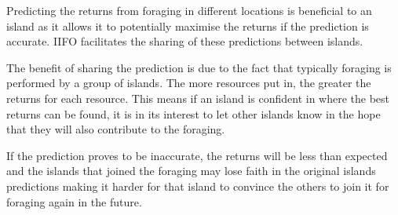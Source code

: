 Predicting the returns from foraging in different locations is beneficial to an island as it allows it to potentially maximise the returns if the prediction is accurate. IIFO facilitates the sharing of these predictions between islands.

The benefit of sharing the prediction is due to the fact that typically foraging is performed by a group of islands. The more resources put in, the greater the returns for each resource. This means if an island is confident in where the best returns can be found, it is in its interest to let other islands know in the hope that they will also contribute to the foraging.

If the prediction proves to be inaccurate, the returns will be less than expected and the islands that joined the foraging may lose faith in the original islands predictions making it harder for that island to convince the others to join it for foraging again in the future.
